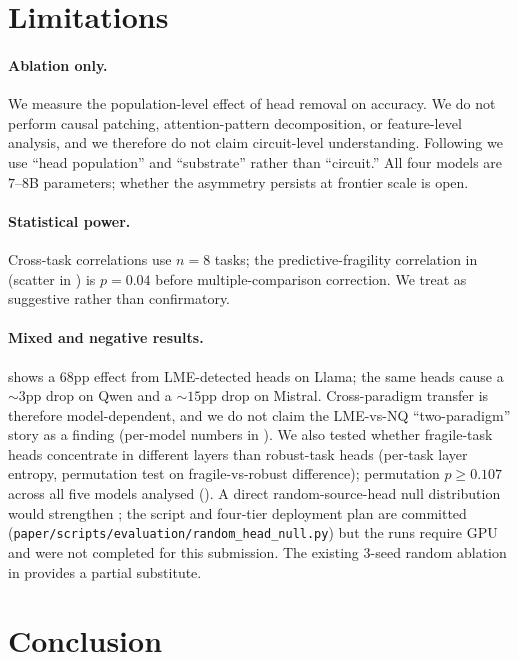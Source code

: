 \documentclass{article}
\theoremstyle{plain}
\theoremstyle{definition}
\theoremstyle{remark}
\begin{document}
\section{Limitations}
\label{sec:limitations}

\paragraph{Ablation only.} We measure the population-level effect of head removal on accuracy. We do not perform causal patching, attention-pattern decomposition, or feature-level analysis, and we therefore do not claim circuit-level understanding. Following \citet{sharkey2025openproblems} we use ``head population'' and ``substrate'' rather than ``circuit.'' All four models are $7$--$8$B parameters; whether the asymmetry persists at frontier scale is open.

\paragraph{Statistical power.} Cross-task correlations use $n{=}8$ tasks; the predictive-fragility correlation in  (scatter in ) is $p = 0.04$ before multiple-comparison correction. We treat  as suggestive rather than confirmatory.

\paragraph{Mixed and negative results.}  shows a $68$pp effect from LME-detected heads on Llama; the same heads cause a $\sim 3$pp drop on Qwen and a $\sim 15$pp drop on Mistral. Cross-paradigm transfer is therefore model-dependent, and we do not claim the LME-vs-NQ ``two-paradigm'' story as a finding (per-model numbers in ). We also tested whether fragile-task heads concentrate in different layers than robust-task heads (per-task layer entropy, permutation test on fragile-vs-robust difference); permutation $p \geq 0.107$ across all five models analysed (). A direct random-source-head null distribution would strengthen ; the script and four-tier deployment plan are committed (\texttt{paper/scripts/evaluation/random\_head\_null.py}) but the runs require GPU and were not completed for this submission. The existing $3$-seed random ablation in  provides a partial substitute.

\section{Conclusion}
\end{document}
